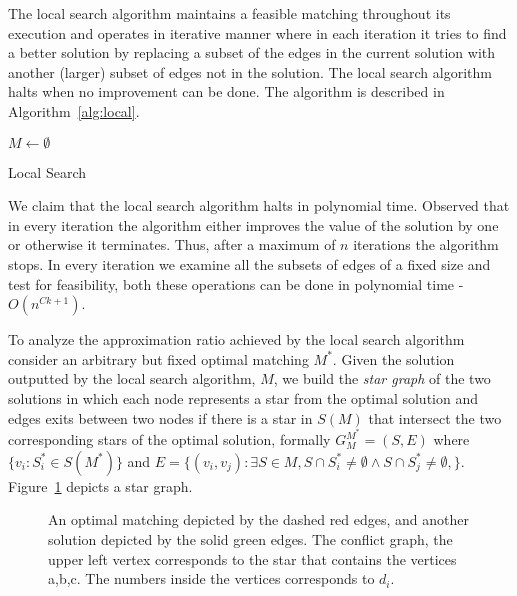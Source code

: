 The local search algorithm maintains a feasible matching throughout its execution
and operates in 
iterative manner where in each iteration it tries to find a better solution by
replacing a subset of the edges in the current solution with 
another (larger) subset of edges not in the solution.
The local search algorithm halts when no improvement can be done.
The algorithm is described in Algorithm~\ref{alg:local}. 

\begin{algorithm}
$M \leftarrow \emptyset$								\\

\caption{
\label{alg:local}
Local Search}
\end{algorithm}


We claim that the local search algorithm halts in polynomial time.
Observed that in every iteration the algorithm either improves the value of the solution
by one or otherwise it terminates. 
Thus, after a maximum of $n$ iterations the algorithm stops.
In every iteration we examine all the subsets of edges of a fixed size and test for feasibility,
both these operations can be done in polynomial time - $O(n^{Ck + 1})$. 

To analyze the approximation ratio achieved by the local search algorithm consider an 
arbitrary but fixed optimal matching $M^*$.
Given the solution outputted by the local search algorithm, 
$M$, 
we build the \emph{star graph} of the two solutions
in which each node represents a star from the optimal solution 
and edges exits between two nodes if
there is a star in $S(M)$ that intersect the two
corresponding stars of the optimal solution, 
formally $G^{M^*}_M = (S, E)$ where $\{v_i : S^*_i \in S(M^*) \}$ 
and 
$E = \{(v_i, v_j) : 
\exists S \in M,
S \cap S^*_i \neq \emptyset \land S \cap S^*_j \neq \emptyset,
\}$.
Figure~\ref{fig:conflict} depicts a star graph.

\begin{figure}[ht]
\centering
\subfloat[]{
\label{subfloat:graph}

}
\subfloat[]{
\label{subfloat:conflict}

}
\caption[]{
\label{fig:conflict}
An optimal matching depicted by the dashed red edges,
and another solution depicted by the solid green edges.  
The conflict graph, the upper left vertex corresponds 
to the star that contains the vertices a,b,c.
The numbers inside the vertices corresponds to $d_i$.   
}
\end{figure}  

